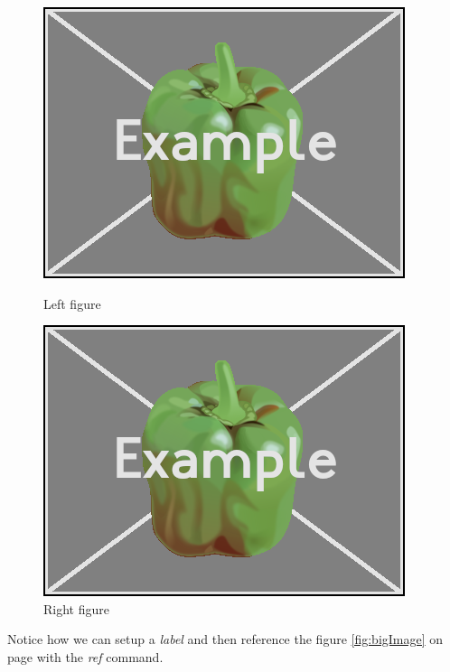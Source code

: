 \begin{figure}[H]
	\centering
	\begin{minipage}[b]{0.45\textwidth}
		\includegraphics[width=\textwidth]{res/example.png}
		\caption{Left figure}
	\end{minipage}
	\hfill
	\begin{minipage}[b]{0.45\textwidth}
		\includegraphics[width=\textwidth]{res/example.png}
		\caption{Right figure}
	\end{minipage}
\end{figure}

Notice how we can setup a \emph{label} and then reference the figure \ref{fig:bigImage} on page \pageref{fig:bigImage} with the \emph{ref} command.

